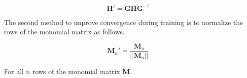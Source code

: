 \begin{equation}
\textbf{H}' = \textbf{G} \textbf{H} \textbf{G}^{-1}
\end{equation}

The second method to improve convergence during training is to normalize the rows of the monomial matrix as follows.

\begin{equation}
\textbf{M}_n' = \frac{\textbf{M}_n}{||\textbf{M}_n||}
\end{equation}

For all $n$ rows of the monomial matrix $\textbf{M}$.





